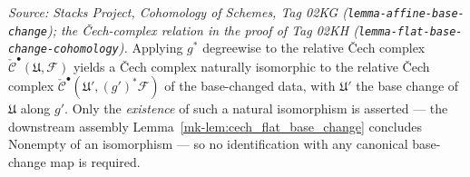 \begin{definition}
  \label{mk-def:cech_complex_base_change_iso}

  \textit{Source: Stacks Project, Cohomology of Schemes, Tag 02KG
  (\texttt{lemma-affine-base-change}); the {\v C}ech-complex relation in the proof of
  Tag 02KH (\texttt{lemma-flat-base-change-cohomology}).}
  Applying \(g^*\) degreewise to the relative {\v C}ech complex
  \(\check{\mathcal{C}}^\bullet(\mathfrak{U}, \mathcal{F})\) yields a {\v C}ech complex
  naturally isomorphic to the relative {\v C}ech complex
  \(\check{\mathcal{C}}^\bullet(\mathfrak{U}', (g')^*\mathcal{F})\) of the base-changed
  data, with \(\mathfrak{U}'\) the base change of \(\mathfrak{U}\) along \(g'\). Only the
  \emph{existence} of such a natural isomorphism is asserted --- the downstream
  assembly Lemma~\ref{mk-lem:cech_flat_base_change} concludes \(\mathrm{Nonempty}\) of an
  isomorphism --- so no identification with any canonical base-change map is required.
\end{definition}
